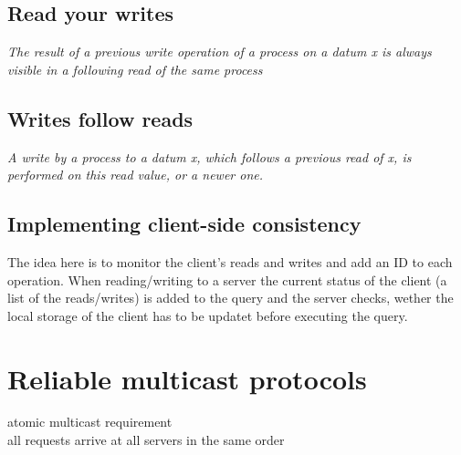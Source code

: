 \subsection{Read your writes}
\emph{The result of a previous write operation of a process on a datum x is always visible in a following read of the same process}

\subsection{Writes follow reads}
\emph{A write by a process to a datum x, which follows a previous read of x, is performed on this read value, or a newer one.}

\subsection{Implementing client-side consistency}
The idea here is to monitor the client's reads and writes and add an ID to each operation. When reading/writing to a server the current status of the client (a list of the reads/writes) is added to the query and the server checks, wether the local storage of the client has to be updatet before executing the query.

\section{Reliable multicast protocols}
\begin{compactitem}
	\item atomic multicast requirement\\
	all requests arrive at all servers in the same order
\end{compactitem}
